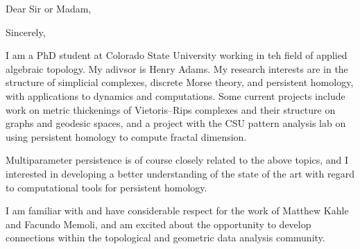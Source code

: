 \documentclass[11pt,letterpaper,sans]{moderncv}        %
\begin{document}
\clearpage
\date{\today}
\opening{Dear Sir or Madam,}
\closing{Sincerely,}
\makelettertitle


I am a PhD student at Colorado State University working in teh field of applied algebraic topology. 
My adivsor is Henry Adams.
My research interests are in the structure of simplicial complexes, discrete Morse theory, and persistent homology, with applications to dynamics and computations.
Some current projects include work on metric thickenings of Vietoris--Rips complexes and their structure on graphs and geodesic spaces, and a project with the CSU pattern analysis lab on using persistent homology to compute fractal dimension.%

Multiparameter persistence is of course closely related to the above topics, and I interested in developing a better understanding of the state of the art with regard to computational tools for persistent homology.

I am familiar with and have considerable respect for the work of Matthew Kahle and Facundo Memoli,
and am excited about the opportunity to develop connections within the topological and geometric data analysis community.


\end{document}
